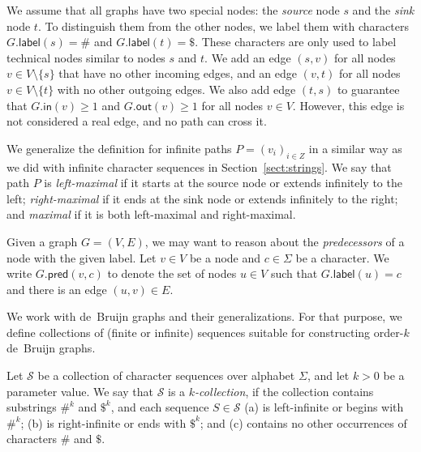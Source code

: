 \documentclass[a4paper,UKenglish]{lipics-v2016}
\newcommand{\set}[1]{\ensuremath{\{ #1 \}}}
\newcommand{\gindegree}{\ensuremath{\mathsf{in}}}
\newcommand{\goutdegree}{\ensuremath{\mathsf{out}}}
\newcommand{\glabel}{\ensuremath{\mathsf{label}}}
\newcommand{\gpred}{\ensuremath{\mathsf{pred}}}
\newcommand{\kcollection}[1]{$#1$\nobreakdash-collection}
\newcommand{\orderk}[1]{order\nobreakdash-$#1$}
\begin{document}
We assume that all graphs have two special nodes: the \emph{source} node $s$ and the \emph{sink} node $t$. To distinguish them from the other nodes, we label them with characters $G.\glabel(s) = \#$ and $G.\glabel(t) = \$$. These characters are only used to label technical nodes similar to nodes $s$ and $t$. We add an edge $(s, v)$ for all nodes $v \in V \setminus \set{s}$ that have no other incoming edges, and an edge $(v, t)$ for all nodes $v \in V \setminus \set{t}$ with no other outgoing edges. We also add edge $(t, s)$ to guarantee that $G.\gindegree(v) \ge 1$ and $G.\goutdegree(v) \ge 1$ for all nodes $v \in V$. However, this edge is not considered a real edge, and no path can cross it.

We generalize the definition for infinite paths $P = (v_{i})_{i \in Z}$ in a similar way as we did with infinite character sequences in Section~\ref{sect:strings}. We say that path $P$ is \emph{left-maximal} if it starts at the source node or extends infinitely to the left; \emph{right-maximal} if it ends at the sink node or extends infinitely to the right; and \emph{maximal} if it is both left-maximal and right-maximal.

Given a graph $G = (V, E)$, we may want to reason about the \emph{predecessors} of a node with the given label. Let $v \in V$ be a node and $c \in \Sigma$ be a character. We write $G.\gpred(v, c)$ to denote the set of nodes $u \in V$ such that $G.\glabel(u) = c$ and there is an edge $(u, v) \in E$.

We work with de~Bruijn graphs and their generalizations. For that purpose, we define collections of (finite or infinite) sequences suitable for constructing \orderk{k} de~Bruijn graphs.

\begin{definition}[\kcollection{k}]
Let $\mathcal{S}$ be a collection of character sequences over alphabet $\Sigma$, and let $k > 0$ be a parameter value. We say that $\mathcal{S}$ is a \emph{\kcollection{k}}, if the collection contains substrings $\#^{k}$ and $\$^{k}$, and each sequence $S \in \mathcal{S}$
(a) is left-infinite or begins with $\#^{k}$;
(b) is right-infinite or ends with $\$^{k}$; and
(c) contains no other occurrences of characters $\#$ and $\$$.
\end{definition}
\end{document}
